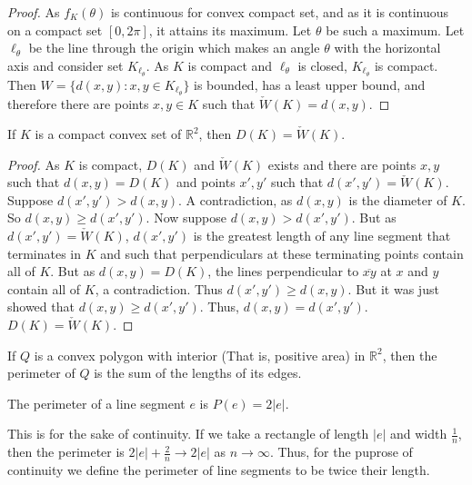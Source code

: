 \documentclass[crop=false,class=article,oneside]{standalone}
\begin{document}
        \begin{proof}
        As $f_K(\theta)$ is continuous for convex compact set, and as it is continuous on a compact set $[0,2\pi]$, it attains its maximum. Let $\theta$ be such a maximum. Let $\ell_{\theta}$ be the line through the origin which makes an angle $\theta$ with the horizontal axis and consider set $K_{\ell_{\theta}}$. As $K$ is compact and $\ell_{\theta}$ is closed, $K_{\ell_{\theta}}$ is compact. Then $W=\{d(x,y):x,y\in K_{\ell_{\theta}}\}$ is bounded, has a least upper bound, and therefore there are points $x,y \in K$ such that $\check{W}(K)=d(x,y)$.
        \end{proof}
        \begin{theorem}
        If $K$ is a compact convex set of $\mathbb{R}^2$, then $D(K) = \check{W}(K)$.
        \end{theorem}
        \begin{proof}
        As $K$ is compact, $D(K)$ and $\check{W}(K)$ exists and there are points $x,y$ such that $d(x,y) = D(K)$ and points $x',y'$ such that $d(x',y') = \check{W}(K)$. Suppose $d(x',y')> d(x,y)$. A contradiction, as $d(x,y)$ is the diameter of $K$. So $d(x,y) \geq d(x',y')$. Now suppose $d(x,y)>d(x',y')$. But as $d(x',y')= \check{W}(K)$, $d(x',y')$ is the greatest length of any line segment that terminates in $K$ and such that perpendiculars at these terminating points contain all of $K$. But as $d(x,y)=D(K)$, the lines perpendicular to $\overline{xy}$ at $x$ and $y$ contain all of $K$, a contradiction. Thus $d(x',y') \geq d(x,y)$. But it was just showed that $d(x,y)\geq d(x',y')$. Thus, $d(x,y) = d(x',y')$. $D(K) = \check{W}(K)$.
        \end{proof}
        \begin{definition}
        If $Q$ is a convex polygon with interior (That is, positive area) in $\mathbb{R}^2$, then the perimeter of $Q$ is the sum of the lengths of its edges. 
        \end{definition}
        \begin{definition}
        The perimeter of a line segment $e$ is $P(e) = 2|e|$.
        \end{definition}
        \begin{remark}
        This is for the sake of continuity. If we take a rectangle of length $|e|$ and width $\frac{1}{n}$, then the perimeter is $2|e|+\frac{2}{n} \rightarrow 2|e|$ as $n\rightarrow \infty$. Thus, for the puprose of continuity we define the perimeter of line segments to be twice their length.
        \end{remark}
\end{document}
